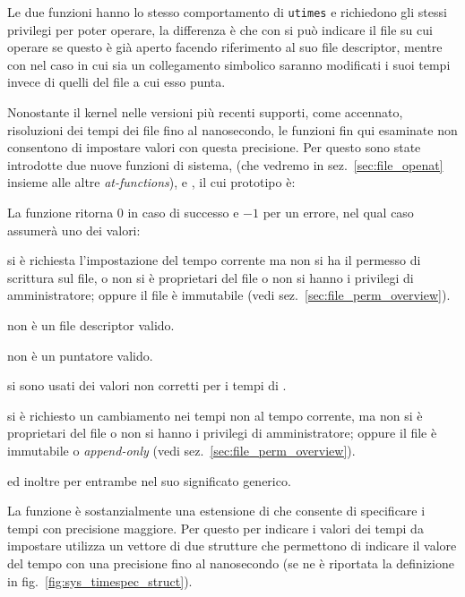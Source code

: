 Le due funzioni hanno lo stesso comportamento di \texttt{utimes} e richiedono
gli stessi privilegi per poter operare, la differenza è che con 
si può indicare il file su cui operare se questo è già aperto facendo
riferimento al suo file descriptor, mentre con  nel caso in
cui  sia un collegamento simbolico saranno modificati i suoi
tempi invece di quelli del file a cui esso punta.

Nonostante il kernel nelle versioni più recenti supporti, come accennato,
risoluzioni dei tempi dei file fino al nanosecondo, le funzioni fin qui
esaminate non consentono di impostare valori con questa precisione. Per questo
sono state introdotte due nuove funzioni di sistema,  (che
vedremo in sez.~\ref{sec:file_openat} insieme alle altre
\textit{at-functions}), e , il cui prototipo è:

\begin{funcproto}{
}

{La funzione ritorna $0$ in caso di successo e $-1$ per un errore, nel qual
  caso  assumerà uno dei valori:
  \begin{errlist}
  \item[\errcode{EACCES}] si è richiesta l'impostazione del tempo corrente ma
    non si ha il permesso di scrittura sul file, o non si è proprietari del
    file o non si hanno i privilegi di amministratore; oppure il file è
    immutabile (vedi sez.~\ref{sec:file_perm_overview}).
  \item[\errcode{EBADF}]  non è un file descriptor valido.
  \item[\errcode{EFAULT}]  non è un puntatore valido.
  \item[\errcode{EINVAL}] si sono usati dei valori non corretti per i tempi di
    .
  \item[\errcode{EPERM}] si è richiesto un cambiamento nei tempi non al tempo
    corrente, ma non si è proprietari del file o non si hanno i privilegi di
    amministratore; oppure il file è immutabile o \textit{append-only} (vedi
    sez.~\ref{sec:file_perm_overview}).
  \end{errlist}
  ed inoltre per entrambe  nel suo significato generico.}
\end{funcproto}

La funzione è sostanzialmente una estensione di  che consente di
specificare i tempi con precisione maggiore. Per questo per indicare i valori
dei tempi da impostare utilizza un vettore  di due strutture
 che permettono di indicare il valore del tempo con una
precisione fino al nanosecondo (se ne è riportata la definizione in
fig.~\ref{fig:sys_timespec_struct}).

